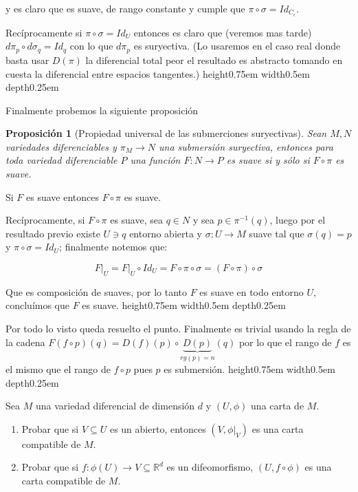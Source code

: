 \documentclass[11pt]{article}
\newcommand{\R}{{\mathbb{R}}}
\numberwithin{theorem}{subsection}
\newtheorem{proposition}[theorem]{Proposici\'on}
\newenvironment{proof}[1][Demostraci\'on]{\begin{trivlist}
		\item[\hskip \labelsep {\bfseries #1}]}{\end{trivlist}}
\newcommand{\qed}{\nobreak \ifvmode \relax \else
	\ifdim\lastskip<1.5em \hskip-\lastskip
	\hskip1.5em plus0em minus0.5em \fi \nobreak
	\vrule height0.75em width0.5em depth0.25em\fi}
\begin{document}
\begin{solution}
\begin{proof}
		y es claro que es suave, de rango constante y cumple que $\pi \circ \sigma = Id_{C_{\epsilon}}$.
		
		Rec\'iprocamente si $\pi \circ \sigma = Id_U$ entonces es claro que (veremos mas tarde) $d\pi_p \circ d\sigma_q = Id_q$ con lo que $d\pi_p$ es suryectiva. (Lo usaremos en el caso real donde basta usar $D(\pi)$ la diferencial total peor el resultado es abstracto tomando en cuesta la diferencial entre espacios tangentes.) \qed
		
	\end{proof}
	
	Finalmente probemos la siguiente proposici\'on
	
	\begin{proposition}[Propiedad universal de las submerciones suryectivas]
		Sean $M,N$ variedades diferenciables y $\pi_M \rightarrow N$ una submersi\'on suryectiva, entonces para toda variedad diferenciable $P$ una funci\'on $F:N \rightarrow P$ es suave si y s\'olo si $F \circ \pi$ es suave.
	\end{proposition}
	
	\begin{proof}
		Si $F$ es suave entonces $F \circ \pi$ es suave.
		
		Rec\'iprocamente, si $F \circ \pi$ es suave, sea $q \in N$ y sea $p \in \pi^{-1}(q)$, luego por el resultado previo existe $U \ni q$ entorno abierta y $\sigma : U \rightarrow M$ suave tal que $\sigma(q) = p$ y $\pi \circ \sigma = Id_U$; finalmente notemos que:
		
		\begin{equation*}
			F \vert_U = F \vert_U \circ Id_U = F \circ \pi \circ \sigma = (F \circ \pi) \circ \sigma
		\end{equation*}
		
		Que es composici\'on de suaves, por lo tanto $F$ es suave en todo entorno $U$, conclu\'imos que $F$ es suave.\qed
		
	\end{proof}
	
	Por todo lo visto queda resuelto el punto. Finalmente es trivial usando la regla de la cadena $F(f \circ p) (q) = D(f)(p) \circ \underbrace{D(p)}_{rg(p)=n}(q)$ por lo que el rango de $f$ es el mismo que el rango de $f \circ p$ pues $p$ es submersi\'on. \qed
	
\end{solution}

\begin{question}
	Sea $M$ una variedad diferencial de dimensi\'on $d$ y $(U,\phi)$ una carta de $M$.
	\begin{enumerate}
		\item Probar que si $V\subseteq U$ es un abierto, entonces $(V,\left.\phi\right|_V)$ es una carta compatible de $M$.
		\item Probar que si $f:\phi(U)\to V\subseteq\R^d$ es un difeomorfismo, $(U,f\circ\phi)$ es una carta compatible de $M$.
	\end{enumerate}
\end{question}
\end{document}
